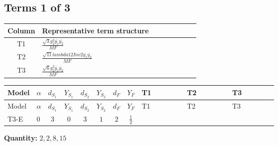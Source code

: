 \documentclass[8pt]{article}
\begin{document}
\begin{landscape}
\subsection*{Terms 1 of 3}
\begin{center}
\begin{tabular}{@{}c >{\raggedright\arraybackslash}p{0.82\linewidth}@{}}
\toprule
Column & Representative term structure \\
\midrule
T1 & \(\displaystyle \frac{\sqrt{3} g_{2}^{2} \overline{y_{1}} \overline{y_{2}}}{MF}\) \\
\midrule
T2 & \(\displaystyle \frac{\sqrt{11} lambda12Inv2 \overline{y_{1}} \overline{y_{2}}}{MF}\) \\
\midrule
T3 & \(\displaystyle \frac{\sqrt{6} g_{2}^{2} \overline{y_{1}} \overline{y_{2}}}{MF}\) \\
\midrule
\bottomrule
\end{tabular}
\end{center}
\smallskip
\tiny
\begin{longtable}{@{}llcccccc >{\raggedright\arraybackslash}p{0.21\linewidth} >{\raggedright\arraybackslash}p{0.21\linewidth} >{\raggedright\arraybackslash}p{0.21\linewidth}@{}}
\toprule
Model & $\alpha$ & $d_{S_1}$ & $Y_{S_1}$ & $d_{S_2}$ & $Y_{S_2}$ & $d_F$ & $Y_F$ & T1 & T2 & T3 \\
\midrule
\endfirsthead
\toprule
Model & $\alpha$ & $d_{S_1}$ & $Y_{S_1}$ & $d_{S_2}$ & $Y_{S_2}$ & $d_F$ & $Y_F$ & T1 & T2 & T3 \\
\midrule
\endhead
T3-E & $0$ & $3$ & $0$ & $3$ & $1$ & $2$ & $\frac{1}{2}$ & \scriptsize\adjustbox{max width=\linewidth}{$\begin{gathered} - \frac{49 \sqrt{3} g_{2}^{2} \overline{y_{1}} \overline{y_{2}}}{24 MF}\end{gathered}$} & \scriptsize\adjustbox{max width=\linewidth}{$\begin{gathered} - \frac{3 \sqrt{11} lambda12Inv2 \overline{y_{1}} \overline{y_{2}}}{22 MF}\end{gathered}$} & \scriptsize\adjustbox{max width=\linewidth}{$\begin{gathered} - \frac{\sqrt{6} g_{2}^{2} \overline{y_{1}} \overline{y_{2}}}{3 MF}\end{gathered}$} \\
\midrule
\bottomrule
\end{longtable}
\clearpage
\noindent\textbf{Quantity: }$\mathrm{2,2,8,15}$\par\smallskip

\end{landscape}
\end{document}

